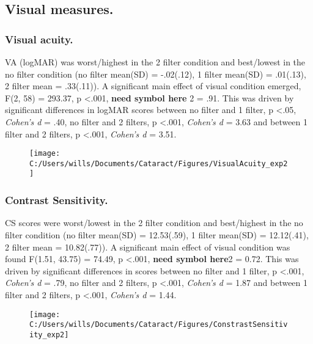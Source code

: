 \documentclass[
  english,
  man,floatsintext]{apa6}
\begin{document}
\hypertarget{visual-measures.}{%
\subsection{Visual measures.}\label{visual-measures.}}

\hypertarget{visual-acuity.}{%
\subsubsection{Visual acuity.}\label{visual-acuity.}}

VA (logMAR) was worst/highest in the 2 filter condition and best/lowest in the no filter condition (no filter mean(SD) = -.02(.12), 1 filter mean(SD) = .01(.13), 2 filter mean = .33(.11)).
A significant main effect of visual condition emerged, F(2, 58) = 293.37, p \textless{}.001, \textbf{need symbol here} 2 = .91.
This was driven by significant differences in logMAR scores between no filter and 1 filter, p \textless{}.05, \emph{Cohen's d} = .40, no filter and 2 filters, p \textless{}.001, \emph{Cohen's d} = 3.63 and between 1 filter and 2 filters, p \textless{}.001, \emph{Cohen's d} = 3.51.

\begin{figure}

{\centering \texttt{[image: C:/Users/wills/Documents/Cataract/Figures/VisualAcuity\_exp2]} 

}

\caption{ }\label{fig:unnamed-chunk-4}
\end{figure}

\hypertarget{contrast-sensitivity.}{%
\subsubsection{Contrast Sensitivity.}\label{contrast-sensitivity.}}

CS scores were worst/lowest in the 2 filter condition and best/highest in the no filter condition (no filter mean(SD) = 12.53(.59), 1 filter mean(SD) = 12.12(.41), 2 filter mean = 10.82(.77)).
A significant main effect of visual condition was found F(1.51, 43.75) = 74.49, p \textless{}.001, \textbf{need symbol here}2 = 0.72.
This was driven by significant differences in scores between no filter and 1 filter, p \textless{}.001, \emph{Cohen's d} = .79, no filter and 2 filters, p \textless{}.001, \emph{Cohen's d} = 1.87 and between 1 filter and 2 filters, p \textless{}.001, \emph{Cohen's d} = 1.44.

\begin{figure}

{\centering \texttt{[image: C:/Users/wills/Documents/Cataract/Figures/ConstrastSensitivity\_exp2]} 

}

\caption{ }\label{fig:unnamed-chunk-5}
\end{figure}
\end{document}
